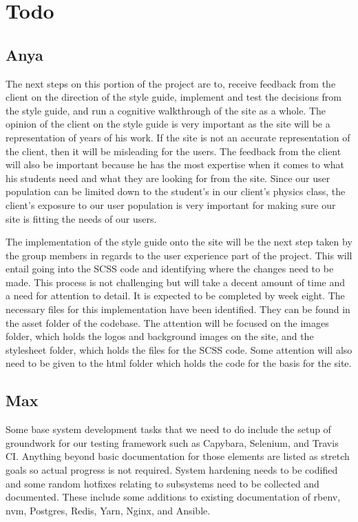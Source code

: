 \documentclass[onecolumn, draftclsnofoot,10pt, compsoc]{IEEEtran}
\begin{document}
\section{Todo}
\subsection{Anya}
The next steps on this portion of the project are to, receive feedback from the client on the direction of the style guide, implement and test the decisions from the style guide, and run a cognitive walkthrough of the site as a whole. The opinion of the client on the style guide is very important as the site will be a representation of years of his work. If the site is not an accurate representation of the client, then it will be misleading for the users. The feedback from the client will also be important because he has the most expertise when it comes to what his students need and what they are looking for from the site. Since our user population can be limited down to the student’s in our client’s physics class, the client’s exposure to our user population is very important for making sure our site is fitting the needs of our users.

The implementation of the style guide onto the site will be the next step taken by the group members in regards to the user experience part of the project. This will entail going into the SCSS code and identifying where the changes need to be made. This process is not challenging but will take a decent amount of time and a need for attention to detail. It is expected to be completed by week eight. The necessary files for this implementation have been identified. They can be found in the asset folder of the codebase. The attention will be focused on the images folder, which holds the logos and background images on the site, and the stylesheet folder, which holds the files for the SCSS code. Some attention will also need to be given to the html folder which holds the code for the basis for the site.

\subsection{Max}
Some base system development tasks that we need to do include the setup of groundwork for our testing framework such as Capybara, Selenium, and Travis CI. Anything beyond basic documentation for those elements are listed as stretch goals so actual progress is not required. System hardening needs to be codified and some random hotfixes relating to subsystems need to be collected and documented. These include some additions to existing documentation of rbenv, nvm, Postgres, Redis, Yarn, Nginx, and Ansible.
\end{document}
